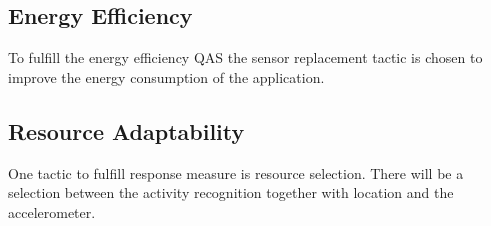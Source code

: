 \subsection{Energy Efficiency}
To fulfill the energy efficiency QAS the sensor replacement tactic is chosen to improve the energy consumption of  the application.


\subsection{Resource Adaptability}
One tactic to fulfill response measure is resource selection. There will be a selection between the activity recognition together with location and the accelerometer. 

 